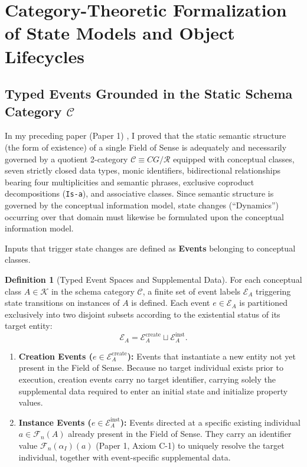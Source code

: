 \documentclass[11pt,a4paper]{article}
\theoremstyle{definition}
\newtheorem{definition}{Definition}[section]
\theoremstyle{plain}
\theoremstyle{remark}
\begin{document}
\section{Category-Theoretic Formalization of State Models and Object Lifecycles}

\subsection{Typed Events Grounded in the Static Schema Category $\mathcal{C}$}
In my preceding paper (Paper 1) \cite{ota2026paper1}, I proved that the static semantic structure (the form of existence) of a single Field of Sense is adequately and necessarily governed by a quotient 2-category $\mathcal{C} \equiv CG/\mathcal{R}$ equipped with conceptual classes, seven strictly closed data types, monic identifiers, bidirectional relationships bearing four multiplicities and semantic phrases, exclusive coproduct decompositions (\texttt{Is-a}), and associative classes. Since semantic structure is governed by the conceptual information model, state changes (``Dynamics'') occurring over that domain must likewise be formulated upon the conceptual information model.

Inputs that trigger state changes are defined as \textbf{Events} belonging to conceptual classes.

\begin{definition}[Typed Event Spaces and Supplemental Data]\label{def:events}
For each conceptual class $A \in \mathcal{K}$ in the schema category $\mathcal{C}$, a finite set of event labels $\mathcal{E}_A$ triggering state transitions on instances of $A$ is defined. Each event $e \in \mathcal{E}_A$ is partitioned exclusively into two disjoint subsets according to the existential status of its target entity:
\begin{equation}
\mathcal{E}_A = \mathcal{E}_A^{\mathrm{create}} \sqcup \mathcal{E}_A^{\mathrm{inst}}.
\end{equation}
\begin{enumerate}
    \item \textbf{Creation Events ($e \in \mathcal{E}_A^{\mathrm{create}}$):} Events that instantiate a new entity not yet present in the Field of Sense. Because no target individual exists prior to execution, creation events carry no target identifier, carrying solely the supplemental data required to enter an initial state and initialize property values.
    \item \textbf{Instance Events ($e \in \mathcal{E}_A^{\mathrm{inst}}$):} Events directed at a specific existing individual $a \in \mathcal{F}_n(A)$ already present in the Field of Sense. They carry an identifier value $\mathcal{F}_n(\alpha_I)(a)$ (Paper 1, Axiom C-1) to uniquely resolve the target individual, together with event-specific supplemental data.
\end{enumerate}
\end{definition}
\end{document}
